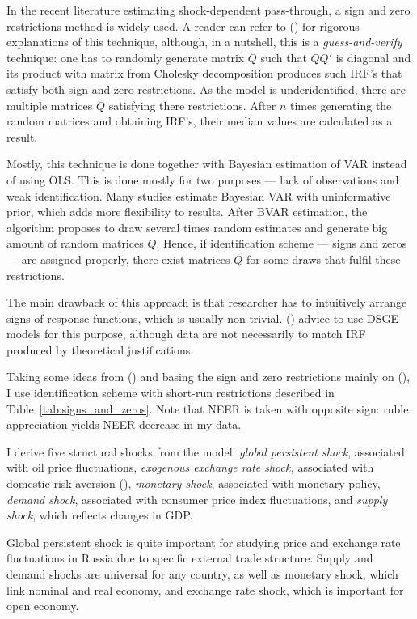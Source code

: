 \documentclass[12pt, a4paper]{extarticle}
\begin{document}
In the recent literature estimating shock-dependent pass-through, a sign and zero restrictions method is widely used. A reader can refer to (\cite{Arias2014}) for rigorous explanations of this technique, although, in a nutshell, this is a \textit{guess-and-verify} technique: one has to randomly generate matrix $Q$ such that $QQ'$ is diagonal and its product with matrix from Cholesky decomposition produces such IRF's that satisfy both sign and zero restrictions. As the model is underidentified, there are multiple matrices $Q$ satisfying there restrictions. After $n$ times generating the random matrices and obtaining IRF's, their median values are calculated as a result. 

Mostly, this technique is done together with Bayesian estimation of VAR instead of using OLS. This is done mostly for two purposes --- lack of observations and weak identification. Many studies estimate Bayesian VAR with uninformative prior, which adds more flexibility to results. After BVAR estimation, the algorithm proposes to draw several times random estimates and generate big amount of random matrices $Q$. Hence, if identification scheme --- signs and zeros --- are assigned properly, there exist matrices $Q$ for some draws that fulfil these restrictions. 

The main drawback of this approach is that researcher has to intuitively arrange signs of response functions, which is usually non-trivial. (\cite{Ortega2020}) advice to use DSGE models for this purpose, although data are not necessarily to match IRF produced by theoretical justifications.

Taking some ideas from (\cite{An2020}) and basing the sign and zero restrictions mainly on (\cite{Forbes2018}), I use identification scheme with short-run restrictions described in Table~\ref{tab:signs_and_zeros}. Note that NEER is taken with opposite sign: ruble appreciation yields NEER decrease in my data.

I derive five structural shocks from the model: \textit{global persistent shock}, associated with oil price fluctuations, \textit{exogenous exchange rate shock,} associated with domestic risk aversion (\cite{Forbes2018}), \textit{monetary shock}, associated with monetary policy, \textit{demand shock}, associated with consumer price index fluctuations, and \textit{supply shock}, which reflects changes in GDP.

Global persistent shock is quite important for studying price and exchange rate fluctuations in Russia due to specific external trade structure. Supply and demand shocks are universal for any country, as well as monetary shock, which link nominal and real economy, and exchange rate shock, which is important for open economy.
\end{document}
